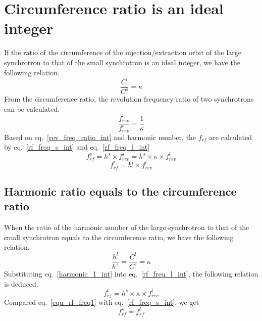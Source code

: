 \section{ Circumference ratio is an ideal integer}
If the ratio of the circumference of the injection/extraction orbit of the large synchrotron to that of the small synchrotron is an ideal integer, we have the following relation. 
\begin{equation}
\frac{C^l}{C^s}=\kappa \label{circumference_ratio_int}
\end{equation}
From the circumference ratio, the revolution frequency ratio of two synchrotrons can be calculated.
\begin{equation}
\frac{f_{rev}^{l}}{f_{rev}^{s}}=\frac{1}{\kappa} \label{rev_freq_ratio_int}
\end{equation}
Based on eq.~\ref{rev_freq_ratio_int} and harmonic number, the $f_{rf}$ are calculated by eq.~\ref{rf_freq_s_int} and eq.~\ref{rf_freq_l_int}
\begin{equation} 
f_{rf}^{s}= h^s \times f_{rev}^{s}=h^s \times \kappa \times f_{rev}^{l} \label{rf_freq_s_int}
\end{equation}
\begin{equation} 
f_{rf}^{l}= h^l \times f_{rev}^{l} \label{rf_freq_l_int}
\end{equation}

\subsection{Harmonic ratio equals to the circumference ratio}
When the ratio of the harmonic number of the large synchrotron to that of the small synchrotron equals to the circumference ratio, we have the following relation.
\begin{equation}
\frac {h^{l}}{h^{s}}=\frac {C^{l}}{C^{s}}= \kappa  \label{harmonic_1_int}
\end{equation}
Substituting eq.~\ref{harmonic_1_int} into eq.~\ref{rf_freq_l_int}, the following relation is deduced. 
\begin{equation}
f_{rf}^{l}= h^s \times \kappa \times f_{rev}^{l} \label{equ_rf_freq1}
\end{equation}
Compared eq.~\ref{equ_rf_freq1} with eq.~\ref{rf_freq_s_int}, we get
\begin{equation}
f_{rf}^{s}= f_{rf}^{l}\label{equ_rf_freq}
\end{equation}

